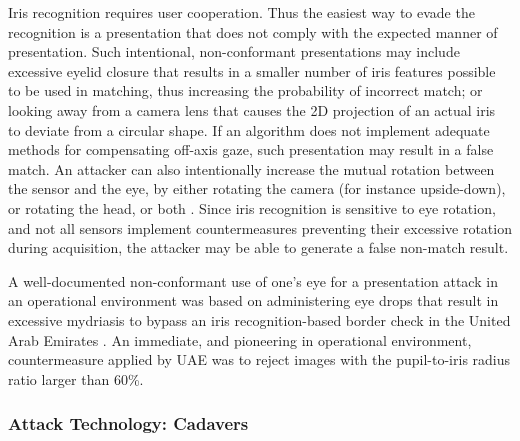 \documentclass[format=acmsmall, review=false, timestamp=false]{acmart}
\begin{document}
Iris recognition requires user cooperation. Thus the easiest way to evade the recognition is a presentation that does not comply with the expected manner of presentation. Such intentional, non-conformant presentations may include excessive eyelid closure that results in a smaller number of iris features possible to be used in matching, thus increasing the probability of incorrect match; or looking away from a camera lens that causes the 2D projection of an actual iris to deviate from a circular shape. If an algorithm does not implement adequate methods for compensating off-axis gaze, such presentation may result in a false match. An attacker can also intentionally increase {the} mutual rotation between the sensor and the eye, by either rotating the camera (for instance upside-down), or rotating the head, or both \cite{Czajka_TIFS_2017}. Since iris recognition is sensitive to eye rotation, and not all sensors implement countermeasures preventing their excessive rotation during acquisition, the attacker may be able to generate a {false non-match result}.

A well-documented non-conformant use of one's eye for a presentation attack in an operational environment was based on administering eye drops that result in excessive mydriasis to bypass an iris recognition-based border check in the United Arab Emirates \cite{Al-Raisi_TI_2008}. An immediate, and pioneering in operational environment, countermeasure applied by UAE was to reject images with the pupil-to-iris radius ratio larger than 60\%.


\subsubsection{Attack Technology: Cadavers}
\end{document}
